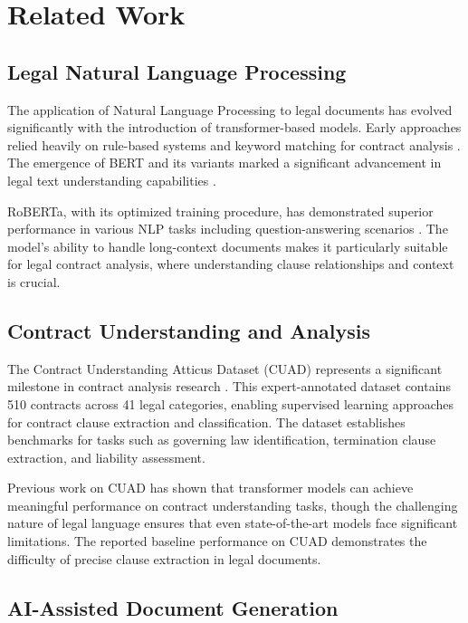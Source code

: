 \section{Related Work}

\subsection{Legal Natural Language Processing}

The application of Natural Language Processing to legal documents has evolved significantly with the introduction of transformer-based models. Early approaches relied heavily on rule-based systems and keyword matching for contract analysis \cite{sulea2017predicting}. The emergence of BERT and its variants marked a significant advancement in legal text understanding capabilities \cite{kenton2019bert}.

RoBERTa, with its optimized training procedure, has demonstrated superior performance in various NLP tasks including question-answering scenarios \cite{liu2019roberta}. The model's ability to handle long-context documents makes it particularly suitable for legal contract analysis, where understanding clause relationships and context is crucial.

\subsection{Contract Understanding and Analysis}

The Contract Understanding Atticus Dataset (CUAD) represents a significant milestone in contract analysis research \cite{hendrycks2021cuad}. This expert-annotated dataset contains 510 contracts across 41 legal categories, enabling supervised learning approaches for contract clause extraction and classification. The dataset establishes benchmarks for tasks such as governing law identification, termination clause extraction, and liability assessment.

Previous work on CUAD has shown that transformer models can achieve meaningful performance on contract understanding tasks, though the challenging nature of legal language ensures that even state-of-the-art models face significant limitations. The reported baseline performance on CUAD demonstrates the difficulty of precise clause extraction in legal documents.

\subsection{AI-Assisted Document Generation}

